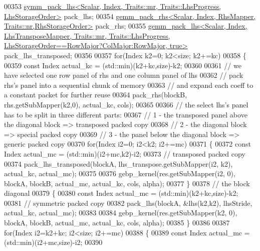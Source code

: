 \begin{DoxyCode}
00353     
      \hyperlink{struct_eigen_1_1internal_1_1symm__pack__lhs}{symm\_pack\_lhs<Scalar, Index, Traits::mr, Traits::LhsProgress, LhsStorageOrder>}
       pack\_lhs;
00354     \hyperlink{struct_eigen_1_1internal_1_1gemm__pack__rhs}{gemm\_pack\_rhs<Scalar, Index, RhsMapper, Traits::nr,RhsStorageOrder>}
       pack\_rhs;
00355     
      \hyperlink{struct_eigen_1_1internal_1_1gemm__pack__lhs}{gemm\_pack\_lhs<Scalar, Index, LhsTransposeMapper, Traits::mr, Traits::LhsProgress,
       LhsStorageOrder==RowMajor?ColMajor:RowMajor, true>}
       pack\_lhs\_transposed;
00356 
00357     \textcolor{keywordflow}{for}(Index k2=0; k2<size; k2+=kc)
00358     \{
00359       \textcolor{keyword}{const} Index actual\_kc = (std::min)(k2+kc,size)-k2;
00360 
00361       \textcolor{comment}{// we have selected one row panel of rhs and one column panel of lhs}
00362       \textcolor{comment}{// pack rhs's panel into a sequential chunk of memory}
00363       \textcolor{comment}{// and expand each coeff to a constant packet for further reuse}
00364       pack\_rhs(blockB, rhs.getSubMapper(k2,0), actual\_kc, cols);
00365 
00366       \textcolor{comment}{// the select lhs's panel has to be split in three different parts:}
00367       \textcolor{comment}{//  1 - the transposed panel above the diagonal block => transposed packed copy}
00368       \textcolor{comment}{//  2 - the diagonal block => special packed copy}
00369       \textcolor{comment}{//  3 - the panel below the diagonal block => generic packed copy}
00370       \textcolor{keywordflow}{for}(Index i2=0; i2<k2; i2+=mc)
00371       \{
00372         \textcolor{keyword}{const} Index actual\_mc = (std::min)(i2+mc,k2)-i2;
00373         \textcolor{comment}{// transposed packed copy}
00374         pack\_lhs\_transposed(blockA, lhs\_transpose.getSubMapper(i2, k2), actual\_kc, actual\_mc);
00375 
00376         gebp\_kernel(res.getSubMapper(i2, 0), blockA, blockB, actual\_mc, actual\_kc, cols, alpha);
00377       \}
00378       \textcolor{comment}{// the block diagonal}
00379       \{
00380         \textcolor{keyword}{const} Index actual\_mc = (std::min)(k2+kc,size)-k2;
00381         \textcolor{comment}{// symmetric packed copy}
00382         pack\_lhs(blockA, &lhs(k2,k2), lhsStride, actual\_kc, actual\_mc);
00383 
00384         gebp\_kernel(res.getSubMapper(k2, 0), blockA, blockB, actual\_mc, actual\_kc, cols, alpha);
00385       \}
00386 
00387       \textcolor{keywordflow}{for}(Index i2=k2+kc; i2<size; i2+=mc)
00388       \{
00389         \textcolor{keyword}{const} Index actual\_mc = (std::min)(i2+mc,size)-i2;
00390         

\end{DoxyCode}
